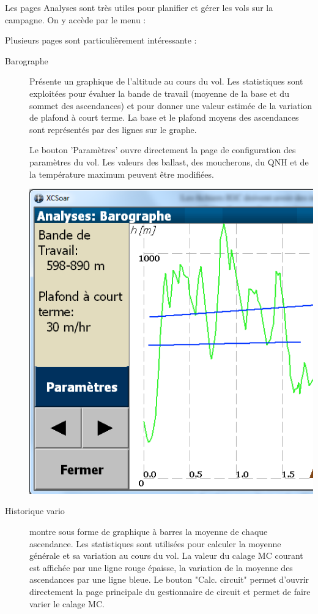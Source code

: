 Les pages Analyses sont très utiles pour planifier et gérer les vols sur la campagne. On y accède par le menu : 
\begin{quote}
\blink{}
\end{quote}

Plusieurs pages sont particulièrement intéressante :
\begin{description}
\item[Barographe]  Présente un graphique de l'altitude au cours du vol. Les statistiques sont exploitées pour évaluer la bande de travail (moyenne de la base et du sommet des ascendances) et pour donner une valeur estimée de la variation de plafond à court terme. La base et le plafond moyens des ascendances sont représentés par des lignes sur le graphe. 

Le bouton 'Paramètres' ouvre directement la page de configuration des paramètres du vol. Les valeurs des ballast, des moucherons, du QNH et de la température maximum peuvent être modifiées.

\begin{center}
\includegraphics[angle=0,width=0.8\linewidth,keepaspectratio='true']{figures/analysis-barograph.png}
\end{center}

\item[Historique vario]
montre sous forme de graphique à barres la moyenne de chaque ascendance. Les statistiques sont utilisées pour calculer la moyenne générale et sa variation au cours du vol. La valeur du calage MC courant est affichée par une ligne rouge épaisse, la variation de la moyenne des ascendances par une ligne bleue.
Le bouton "Calc. circuit" permet d'ouvrir directement la page principale du gestionnaire de circuit et permet de faire varier le calage MC.


\end{description}
